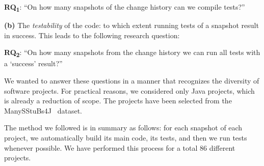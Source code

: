 \def \RQI{On how many snapshots of the change history can we compile tests?}
\def \RQII{On how many snapshots from the change history we can run all tests with a `success' result?}

\textbf{RQ\textsubscript{1}}: ``\RQI''

\textbf{(b)} The \textit{testability} of the code: to which extent running tests of a snapshot result in success. 
This leads to the following research question:

\textbf{RQ\textsubscript{2}}: ``\RQII''


We wanted to answer these questions in a manner that recognizes the diversity of software projects. For practical reasons, we considered only Java projects, which is already a reduction of scope. 
The projects have been selected from the ManySStuBs4J~\cite{karampatsis2020often} dataset.

The method we followed is in summary as follows: for each snapshot of each project, we automatically build its main code, its tests, and then we run tests whenever possible. 
We have performed this process for a total 86 different projects.


